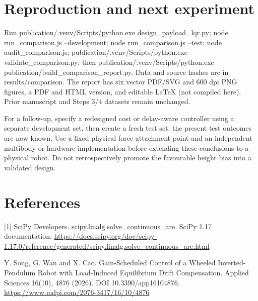 \documentclass[11pt,a4paper]{article}
\begin{document}
\section*{Reproduction and next experiment}
Run publication/.venv/Scripts/python.exe design\_payload\_lqr.py; node run\_comparison.js --development; node run\_comparison.js --test; node audit\_comparison.js; publication/.venv/Scripts/python.exe validate\_comparison.py; then publication/.venv/Scripts/python.exe publication/build\_comparison\_report.py. Data and source hashes are in results/comparison. The report has six vector PDF/SVG and 600 dpi PNG figures, a PDF and HTML version, and editable LaTeX (not compiled here). Prior manuscript and Steps 3/4 datasets remain unchanged.

For a follow-up, specify a redesigned cost or delay-aware controller using a separate development set, then create a fresh test set: the present test outcomes are now known. Use a fixed physical force attachment point and an independent multibody or hardware implementation before extending these conclusions to a physical robot. Do not retrospectively promote the favourable height bias into a validated design.

\section*{References}
[1] SciPy Developers. scipy.linalg.solve\_continuous\_are. SciPy 1.17 documentation. \url{https://docs.scipy.org/doc/scipy-1.17.0/reference/generated/scipy.linalg.solve_continuous_are.html}\par
[2] Y. Song, G. Wan and X. Cao. Gain-Scheduled Control of a Wheeled Inverted-Pendulum Robot with Load-Induced Equilibrium Drift Compensation. Applied Sciences 16(10), 4876 (2026). DOI 10.3390/app16104876. \url{https://www.mdpi.com/2076-3417/16/10/4876}\par
\end{document}
